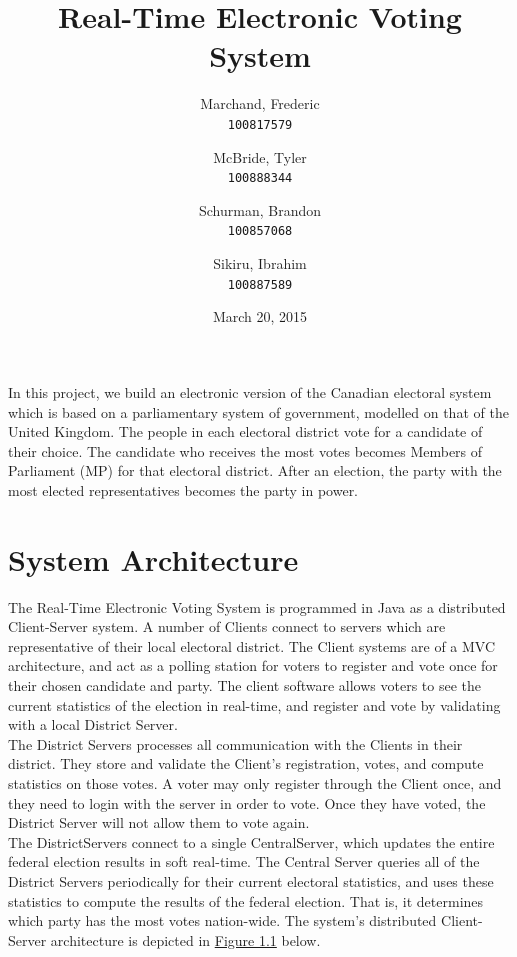 \documentclass[11pt,english]{article}
\begin{document}
\title{\bf Real-Time Electronic Voting System}

\author{
    Marchand, Frederic \\
    \texttt{100817579}
    \and
    McBride, Tyler \\
    \texttt{100888344}
    \and
    Schurman, Brandon \\
    \texttt{100857068}
    \and
    Sikiru, Ibrahim \\
    \texttt{100887589}
}

\date{March 20, 2015}

\maketitle

In this project, we build an electronic version of the Canadian electoral system which is based
on a parliamentary system of government, modelled on that of the United Kingdom. The
people
in each electoral district vote for a candidate of their choice. The candidate who
receives the
most votes becomes Members of Parliament (MP) for that electoral district. After an election, the party with the most elected
representatives
becomes the party in power.


\section{System Architecture}

The Real-Time Electronic Voting System is programmed in Java as a distributed Client-Server
system. A number of Clients connect to servers which are representative of their local
electoral district. The Client systems are of a MVC architecture, and act as a polling
station for voters to register and vote once for their chosen candidate and party. The
client software allows voters to see the current statistics of the election in
real-time, and register and vote by validating with a local District Server. 
\vspace{2mm} \\
The District Servers processes all communication with the Clients in their district. They
store and validate the Client's registration, votes, and compute statistics on those
votes. A voter may only register through the Client once, and they need to login with the
server in order to vote. Once they have voted, the District Server will not allow
them to vote again.
\vspace{2mm} \\
The DistrictServers connect to a single CentralServer, which updates the entire federal election
results in soft real-time. The Central Server queries all of the District Servers
periodically for their current electoral statistics, and uses these statistics to compute
the results of the federal election. That is, it determines which party has the most votes
nation-wide. The system's distributed Client-Server architecture is depicted in
\underline{Figure 1.1} below. \\
\end{document}
